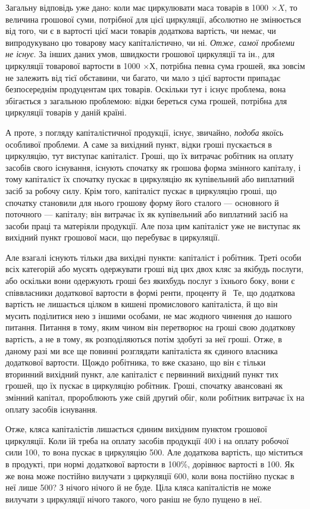 
Загальну відповідь уже дано: коли має циркулювати маса товарів в
1000 $× X$, то величина грошової суми, потрібної для цієї циркуляції,
абсолютно не змінюється від того, чи є в вартості цієї маси товарів
додаткова вартість, чи немає, чи випродукувано цю товарову масу
капіталістично, чи ні. \emph{Отже, самої проблеми не існує}. За інших
даних умов, швидкости грошової циркуляції та ін., для циркуляції товарової
вартости в 1000 $× Х$, потрібна певна сума грошей, яка
зовсім не залежить від тієї обставини, чи багато, чи мало з цієї вартости
припадає безпосереднім продуцентам цих товарів. Оскільки тут і існує
проблема, вона збігається з загальною проблемою: відки береться сума
грошей, потрібна для циркуляції товарів у даній країні.

А проте, з погляду капіталістичної продукції, існує, звичайно, \emph{подоба}
якоїсь особливої проблеми. А саме за вихідний пункт, відки гроші пускається
в циркуляцію, тут виступає капіталіст. Гроші, що їх витрачає
робітник на оплату засобів свого існування, існують спочатку як грошова
форма змінного капіталу, і тому капіталіст їх спочатку пускає в
циркуляцію як купівельний або виплатний засіб за робочу силу. Крім
того, капіталіст пускає в циркуляцію гроші, що спочатку становили для
нього грошову форму його сталого — основного й поточного — капіталу;
він витрачає їх як купівельний або виплатний засіб на засоби праці та
матеріяли продукції. Але поза цим капіталіст уже не виступає як вихідний
пункт грошової маси, що перебуває в циркуляції.

Але взагалі існують тільки два вихідні пункти: капіталіст і робітник.
Треті особи всіх категорій або мусять одержувати гроші від цих двох
кляс за якібудь послуги, або оскільки вони одержують гроші без якихбудь
послуг з їхнього боку, вони є співвласники додаткової вартости в
формі ренти, проценту й~ Те, що додаткова вартість не лишається
цілком в кишені промислового капіталіста, й що він мусить поділитися
нею з іншими особами, не має жодного чинення до нашого питання.
Питання в тому, яким чином він перетворює на гроші свою додаткову
вартість, а не в тому, як розподіляються потім здобуті за неї гроші.
Отже, в даному разі ми все ще повинні розглядати капіталіста як єдиного
власника додаткової вартости. Щождо робітника, то вже сказано, що
він є тільки вторинний вихідний пункт, але капіталіст є первинний
вихідний пункт тих грошей, що їх пускає в циркуляцію робітник. Гроші,
спочатку авансовані як змінний капітал, пророблюють уже свій другий
обіг, коли робітник витрачає їх на оплату засобів існування.

Отже, кляса капіталістів лишається єдиним вихідним пунктом грошової
циркуляції. Коли їй треба на оплату засобів продукції 400
і на оплату робочої сили 100, то вона пускає в циркуляцію
500. Але додаткова вартість, що міститься в продукті, при нормі
додаткової вартости в 100\%, дорівнює вартості в 100. Як
же вона може постійно вилучати з циркуляції 600, коли
вона постійно пускає в неї лише 500? З нічого нічого й не
буде. Ціла кляса капіталістів не може вилучати з циркуляції нічого такого,
чого раніш не було пущено в неї.
